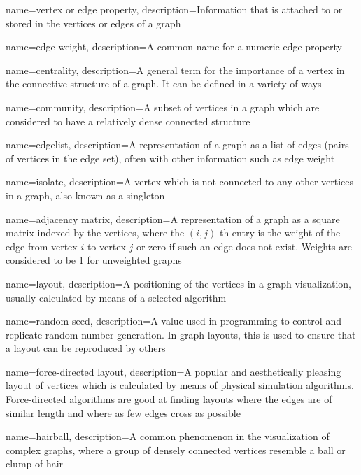 {
    name={vertex or edge property},
    description={Information that is attached to or stored in the vertices or edges of a graph}
}

{
    name={edge weight},
    description={A common name for a numeric edge property}
}

{
    name={centrality},
    description={A general term for the importance of a vertex in the connective structure of a graph.  It can be defined in a variety of ways}
}

{
    name={community},
    description={A subset of vertices in a graph which are considered to have a relatively dense connected structure}
}

{
    name={edgelist},
    description={A representation of a graph as a list of edges (pairs of vertices in the edge set), often with other information such as edge weight}
}

{
    name={isolate},
    description={A vertex which is not connected to any other vertices in a graph, also known as a singleton}
}

{
    name={adjacency matrix},
    description={A representation of a graph as a square matrix indexed by the vertices, where the $(i,j)$-th entry is the weight of the edge from vertex $i$ to vertex $j$ or zero if such an edge does not exist. Weights are considered to be 1 for unweighted graphs}
}

{
    name={layout},
    description={A positioning of the vertices in a graph visualization, usually calculated by means of a selected algorithm}
}

{
    name={random seed},
    description={A value used in programming to control and replicate random number generation.  In graph layouts, this is used to ensure that a layout can be reproduced by others}
}

{
    name={force-directed layout},
    description={A popular and aesthetically pleasing layout of vertices which is calculated by means of physical simulation algorithms.  Force-directed algorithms are good at finding layouts where the edges are of similar length and where as few edges cross as possible}
}

{
    name={hairball},
    description={A common phenomenon in the visualization of complex graphs, where a group of densely connected vertices resemble a ball or clump of hair}
}

